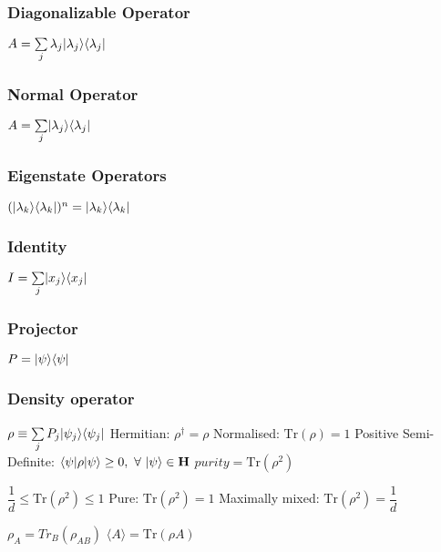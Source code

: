 \subsubsection{Diagonalizable Operator}			
\begin{itemize}
\itemt \( A = \sum\limits_{j} \lambda_j \lvert\lambda_j\rangle \langle\lambda_j\rvert \)
\end{itemize}

\subsubsection{Normal Operator}			
\begin{itemize}
\itemt \( A =\sum\limits_{j} \lvert\lambda_j\rangle \langle\lambda_j\rvert \)
\end{itemize}

\subsubsection{Eigenstate Operators}			
\begin{itemize}
\itemt \( (\lvert\lambda_k\rangle\langle\lambda_k\rvert)^n = \lvert\lambda_k\rangle\langle\lambda_k\rvert \)
\end{itemize}

\subsubsection{Identity}
\begin{itemize}
\itemt \( I = \sum\limits_{j} \lvert x_j\rangle \langle x_j\rvert \)
\end{itemize}

\subsubsection{Projector}
\begin{itemize}
\itemt \( P = \lvert\psi\rangle \langle\psi\rvert \)
\end{itemize}				

\subsubsection{Density operator}
\begin{itemize}
\itemt \( \rho \equiv \sum\limits_{j} P_j \lvert\psi_j\rangle\langle\psi_j\rvert \)
\itemt Hermitian: \( \rho^\dagger = \rho \)
\itemt Normalised: \( \mathrm{Tr} (\rho) = 1 \)
\itemt Positive Semi-Definite: \( \bra{\psi}\rho\ket{\psi} \geq 0, \ \forall \ \ket{\psi} \in \mathbf{H} \)
\itemt \( purity = \mathrm{Tr} (\rho^2) \)
	\begin{itemize}
	\itemt \( \dfrac{1}{d} \leq \mathrm{Tr} (\rho^2) \leq 1 \)
	\itemt Pure: \( \mathrm{Tr} (\rho^2) = 1 \)
	\itemt Maximally mixed: \( \mathrm{Tr} (\rho^2) = \dfrac{1}{d} \)
	\end{itemize}
\itemt \( \rho_A = Tr_B(\rho_{AB}) \)
\itemt \( \langle A\rangle = \mathrm{Tr} (\rho A) \)
\end{itemize}				

